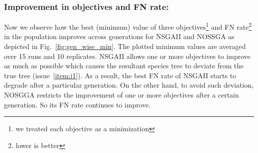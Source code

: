 \subsubsection{Improvement in objectives and FN rate:} Now we observe how the best (minimum) value of three objectives\footnote{we treated each objective as a minimization} and FN rate\footnote{lower is better} in the population improves across generations for NSGAII and NOSSGA as depicted in Fig.~\ref{fig:gen_wise_min}. The plotted minimum values are averaged over 15 runs and 10 replicates. NSGAII allows one or more objectives to improve as much as possible which causes the resultant species tree to deviate from the true tree (issue~\ref{item:i1}). As a result, the best FN rate of NSGAII starts to degrade after a particular generation. On the other hand, to avoid such deviation, NOSGGA restricts the improvement of one or more objectives after a certain generation. So its FN rate continues to improve. %


